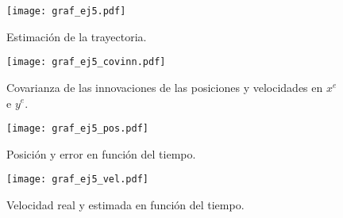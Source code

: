	\begin{figure}[H]
	\centering
	\texttt{[image: graf\_ej5.pdf]}
	\caption{Estimación de la trayectoria.}
	\label{fig:ej5} 
	\end{figure}

	\vspace*{\fill}
	\begin{figure}[H]
	\centering
	\texttt{[image: graf\_ej5\_covinn.pdf]}
	\caption{Covarianza de las innovaciones de las posiciones y velocidades en $x^e$ e $y^e$.}
	\label{fig:5covinn} 
	\end{figure}
	\vspace*{\fill}

	\pagebreak

	\vspace*{\fill}
	\begin{figure}[H]
	\centering
	\texttt{[image: graf\_ej5\_pos.pdf]}
	\caption{Posición y error en función del tiempo.}
	\label{fig:5pos} 
	\end{figure}
	\vspace*{\fill}

	\pagebreak
	
	\begin{figure}[H]
	\centering
	\texttt{[image: graf\_ej5\_vel.pdf]}	
	\caption{Velocidad real y estimada en función del tiempo.}
	\label{fig:5vel} 
	\end{figure}


	

